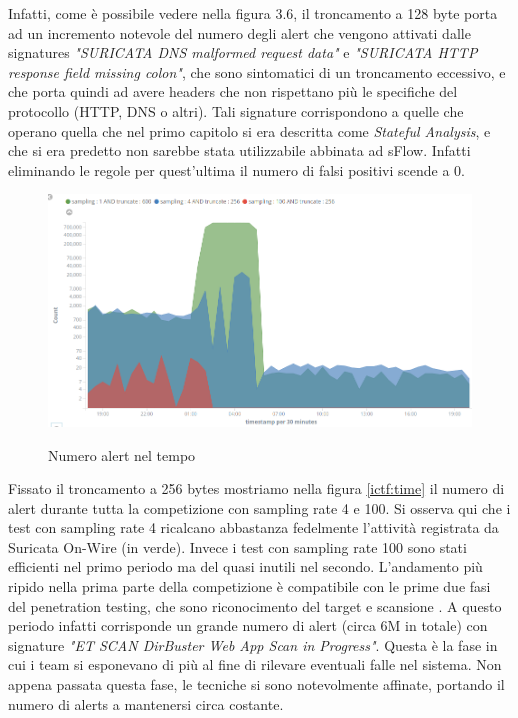 \documentclass[12pt,a4paper,openright,twoside]{report}
\begin{document}
Infatti, come \`e possibile vedere nella figura 3.6, il troncamento a 128 byte porta ad un
incremento notevole del numero degli alert che vengono attivati dalle signatures
{\it "SURICATA DNS malformed request data"} e {\it "SURICATA HTTP response field missing colon"},
che sono sintomatici di un troncamento eccessivo, e che porta quindi ad avere headers che non
rispettano pi\`u le specifiche del protocollo (HTTP, DNS o altri).
Tali signature corrispondono a quelle che operano quella che nel primo capitolo
si era descritta come {\it Stateful Analysis}, e che si era predetto non sarebbe
stata utilizzabile abbinata ad sFlow. Infatti eliminando le regole per quest'ultima il numero di falsi positivi
scende a 0.

\begin{figure}[h!]
\begin{center}                          %
  \includegraphics[width=\textwidth]{images/ICTF-time-alerts.png}
  \caption[ICtF2010 - numero di alert nel tempo]{Numero alert nel tempo}\label{ictf:time}
  \label{}
\end{center}
\end{figure}

Fissato il troncamento a 256 bytes mostriamo nella figura \ref{ictf:time} il numero di alert durante tutta la
competizione con sampling rate 4 e 100. Si osserva qui che i test con sampling rate 4
ricalcano abbastanza fedelmente l'attivit\`a registrata da Suricata On-Wire (in verde).
Invece i test con sampling rate 100 sono stati efficienti nel primo periodo ma del
quasi inutili nel secondo. L'andamento pi\`u ripido nella prima parte della competizione \`e
compatibile con le prime due fasi del penetration testing, che sono riconocimento del target
e scansione \cite{EXP16}. A questo periodo infatti corrisponde un grande numero di alert (circa 6M in totale)
con signature {\it "ET SCAN DirBuster Web App Scan in Progress"}. Questa \`e la fase in cui
i team si esponevano di pi\`u al fine di rilevare eventuali falle nel sistema. Non appena passata
questa fase, le tecniche si sono notevolmente affinate, portando il numero di alerts a  mantenersi circa costante.
\end{document}
